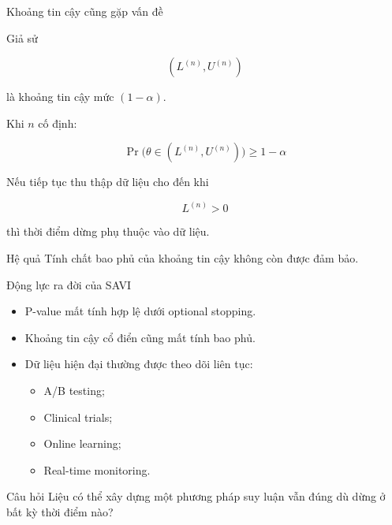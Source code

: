 \begin{frame}{Khoảng tin cậy cũng gặp vấn đề}

Giả sử

\[
(L^{(n)},U^{(n)})
\]

là khoảng tin cậy mức $(1-\alpha)$.

\vspace{0.3cm}

Khi $n$ cố định:

\[
\Pr
\Big(
\theta\in(L^{(n)},U^{(n)})
\Big)
\ge 1-\alpha
\]

\vspace{0.3cm}

Nếu tiếp tục thu thập dữ liệu cho đến khi

\[
L^{(n)}>0
\]

thì thời điểm dừng phụ thuộc vào dữ liệu.

\begin{alertblock}{Hệ quả}
Tính chất bao phủ của khoảng tin cậy không còn được đảm bảo.
\end{alertblock}

\end{frame}

\begin{frame}{Động lực ra đời của SAVI}

\begin{itemize}

\item P-value mất tính hợp lệ dưới optional stopping.

\item Khoảng tin cậy cổ điển cũng mất tính bao phủ.

\item Dữ liệu hiện đại thường được theo dõi liên tục:

\begin{itemize}
\item A/B testing;
\item Clinical trials;
\item Online learning;
\item Real-time monitoring.
\end{itemize}

\end{itemize}

\begin{block}{Câu hỏi}
Liệu có thể xây dựng một phương pháp suy luận vẫn đúng dù dừng ở bất kỳ thời điểm nào?
\end{block}

\end{frame}

